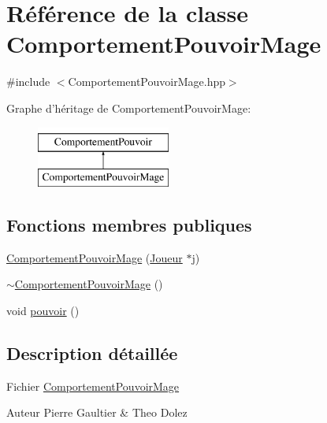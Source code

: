 \hypertarget{class_comportement_pouvoir_mage}{\section{Référence de la classe Comportement\-Pouvoir\-Mage}
\label{class_comportement_pouvoir_mage}
}


{\ttfamily \#include $<$Comportement\-Pouvoir\-Mage.\-hpp$>$}

Graphe d'héritage de Comportement\-Pouvoir\-Mage\-:\begin{figure}[H]
\begin{center}
\leavevmode
\includegraphics[height=2.000000cm]{class_comportement_pouvoir_mage}
\end{center}
\end{figure}
\subsection*{Fonctions membres publiques}
\begin{DoxyCompactItemize}
\item 
\hyperlink{class_comportement_pouvoir_mage_a981ec14dbba67cb5d5c709d84fd23d1d}{Comportement\-Pouvoir\-Mage} (\hyperlink{class_joueur}{Joueur} $\ast$j)
\item 
\hyperlink{class_comportement_pouvoir_mage_a0eb90adc162f3385ad5962b68a9768b8}{$\sim$\-Comportement\-Pouvoir\-Mage} ()
\item 
void \hyperlink{class_comportement_pouvoir_mage_a8a85b640972603a96f87222306e57e7d}{pouvoir} ()
\end{DoxyCompactItemize}


\subsection{Description détaillée}
Fichier \hyperlink{class_comportement_pouvoir_mage}{Comportement\-Pouvoir\-Mage} \begin{DoxyAuthor}{Auteur}
Pierre Gaultier \& Theo Dolez 
\end{DoxyAuthor}


